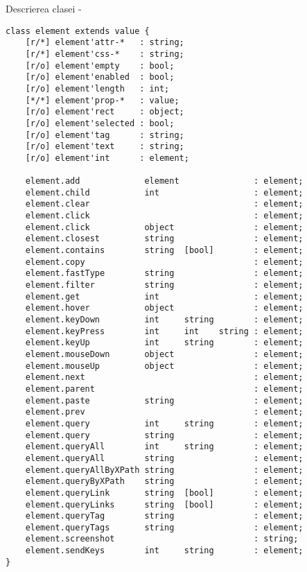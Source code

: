 \noindent Descrierea clasei \element -
\begin{verbatim}
class element extends value {
    [r/*] element'attr-*   : string;
    [r/*] element'css-*    : string;
    [r/o] element'empty    : bool;
    [r/o] element'enabled  : bool;
    [r/o] element'length   : int;
    [*/*] element'prop-*   : value;
    [r/o] element'rect     : object;
    [r/o] element'selected : bool;
    [r/o] element'tag      : string;
    [r/o] element'text     : string;
    [r/o] element'int      : element;

    element.add             element               : element;
    element.child           int                   : element;
    element.clear                                 : element;
    element.click                                 : element;
    element.click           object                : element;
    element.closest         string 	              : element;
    element.contains        string 	[bool]        : element;
    element.copy                                  : element;
    element.fastType        string                : element;
    element.filter          string                : element;
    element.get             int                   : element;
    element.hover           object                : element;
    element.keyDown         int     string        : element;
    element.keyPress        int     int    string : element;
    element.keyUp           int     string        : element;
    element.mouseDown       object                : element;
    element.mouseUp         object                : element;
    element.next                                  : element;
    element.parent                                : element;
    element.paste           string                : element;
    element.prev                                  : element;
    element.query           int     string        : element;
    element.query           string                : element;
    element.queryAll        int     string        : element;
    element.queryAll        string                : element;
    element.queryAllByXPath string 	              : element;
    element.queryByXPath    string 	              : element;
    element.queryLink       string 	[bool]        : element;
    element.queryLinks      string  [bool]        : element;
    element.queryTag        string                : element;
    element.queryTags       string                : element;
    element.screenshot                            : string;
    element.sendKeys        int     string        : element;
}
\end{verbatim}

